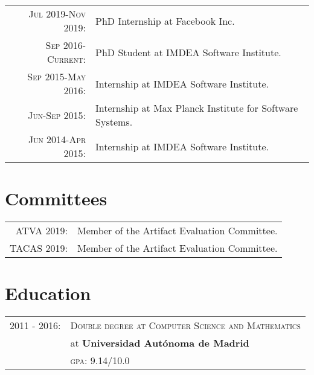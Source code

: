 \documentclass[a4paper,10pt]{article} %
\begin{document}
\begin{tabular}{rp{11cm}}
\textsc{Jul 2019-Nov 2019}: & PhD Internship at Facebook Inc.\\

\textsc{Sep 2016-Current}: & PhD Student at IMDEA Software Institute.\\

\textsc{Sep 2015-May 2016}: & Internship at IMDEA Software Institute.\\

\textsc{Jun-Sep 2015}: & Internship at Max Planck Institute for Software Systems.\\

\textsc{Jun 2014-Apr 2015}: & Internship at IMDEA Software Institute.\\
\end{tabular}


\section{Committees}
\begin{tabular}{rl}
\textsc{ATVA} 2019: & Member of the Artifact Evaluation Committee. \\
\textsc{TACAS} 2019: & Member of the Artifact Evaluation Committee.
\end{tabular}


\section{Education}
\begin{tabular}{rl}

2011 - 2016: & \textsc{Double degree at Computer Science and Mathematics}\\
& at \textbf{Universidad Autónoma de Madrid} \\
& \normalsize \textsc{gpa}: 9.14/10.0\\
\end{tabular}
\end{document}
